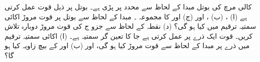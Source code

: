 کالی  مرچ   کی بوتل   مبدا کے لحاظ سے  محدد  پر پڑی ہے۔  بوتل پر  ذیل قوت  عمل کرتی ہے  (ا)   ، 
  (ب)  ، اور (ج)    اور  کا مجموعہ ۔ مبدا کے لحاظ سے بوتل پر قوت مروڑ اکائی سمتیہ ترقیم میں کیا ہو گی؟ (د)  نقطہ  کے لحاظ سے جزو ج  کی قوت مروڑ دوبارہ تلاش کریں۔
قوت 
ایک ذرے پر عمل کرتی ہے جا کا تعین گر سمتیہ  ہے۔ (ا) اکائی سمتیہ ترقیم میں ذرے پر مبدا کے لحاظ  سے قوت مروڑ کیا ہو گی، اور (ب)   اور  کے بیچ زاویہ کیا ہو گا؟

